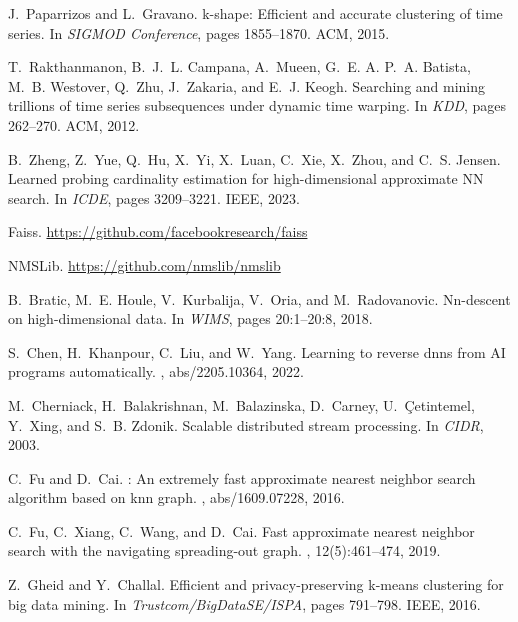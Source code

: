 \documentclass[11pt]{article}
\begin{document}
\begin{thebibliography}{10}
\begin{small}
J.~Paparrizos and L.~Gravano.
\newblock k-shape: Efficient and accurate clustering of time series.
\newblock In {\em {SIGMOD} Conference}, pages 1855--1870. {ACM}, 2015.

T.~Rakthanmanon, B.~J.~L. Campana, A.~Mueen, G.~E. A. P.~A. Batista, M.~B.
Westover, Q.~Zhu, J.~Zakaria, and E.~J. Keogh.
\newblock Searching and mining trillions of time series subsequences under
dynamic time warping.
\newblock In {\em {KDD}}, pages 262--270. {ACM}, 2012.

B.~Zheng, Z.~Yue, Q.~Hu, X.~Yi, X.~Luan, C.~Xie, X.~Zhou, and C.~S. Jensen.
\newblock Learned probing cardinality estimation for high-dimensional
approximate {NN} search.
\newblock In {\em {ICDE}}, pages 3209--3221. {IEEE}, 2023.


Faiss.
\newblock \url{https://github.com/facebookresearch/faiss}

NMSLib.
\newblock \url{https://github.com/nmslib/nmslib}

B.~Bratic, M.~E. Houle, V.~Kurbalija, V.~Oria, and M.~Radovanovic.
\newblock Nn-descent on high-dimensional data.
\newblock In {\em {WIMS}}, pages 20:1--20:8, 2018.

S.~Chen, H.~Khanpour, C.~Liu, and W.~Yang.
\newblock Learning to reverse dnns from {AI} programs automatically.
, abs/2205.10364, 2022.

M.~Cherniack, H.~Balakrishnan, M.~Balazinska, D.~Carney, U.~{\c{C}}etintemel,
Y.~Xing, and S.~B. Zdonik.
\newblock Scalable distributed stream processing.
\newblock In {\em {CIDR}}, 2003.

C.~Fu and D.~Cai.
 : An extremely fast approximate nearest neighbor search
algorithm based on knn graph.
, abs/1609.07228, 2016.

C.~Fu, C.~Xiang, C.~Wang, and D.~Cai.
\newblock Fast approximate nearest neighbor search with the navigating
spreading-out graph.
, 12(5):461--474, 2019.

Z.~Gheid and Y.~Challal.
\newblock Efficient and privacy-preserving k-means clustering for big data
mining.
\newblock In {\em Trustcom/BigDataSE/ISPA}, pages 791--798. {IEEE}, 2016.


\end{small}
\end{thebibliography}
\end{document}
